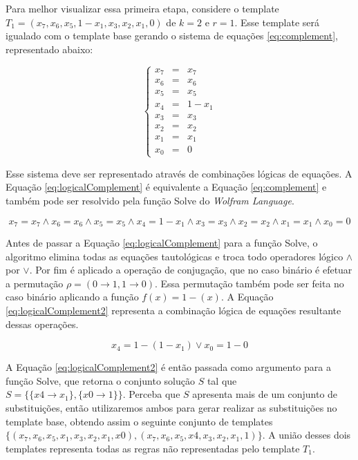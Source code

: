 \documentclass[12pt,a4paper]{article}
\begin{document}
	Para melhor visualizar essa primeira etapa, considere o template $T_1 = (x_7, x_6, x_5, 1 - x_1, x_3, x_2, x_1, 0)$ de $k=2$ e $r=1$. Esse template será igualado com o template base gerando o sistema de equações \ref{eq:complement}, representado abaixo:
	
	\begin{equation}
	\left\{\begin{matrix}
	x_7 & = & x_7	\\ 
	x_6 & = & x_6	\\ 
	x_5 & = & x_5	\\ 
	x_4 & = & 1 - x_1 \\ 
	x_3 & = & x_3	\\ 
	x_2 & = & x_2	\\ 
	x_1 & = & x_1	\\ 
	x_0 & = & 0
	\end{matrix}\right.
	\label{eq:complement}
	\end{equation}

	Esse sistema deve ser representado através de combinações lógicas de equações. A Equação \ref{eq:logicalComplement} é equivalente a Equação \ref{eq:complement} e também pode ser resolvido pela função Solve do \textit{Wolfram Language}.

	\begin{equation}
	x_7 = x_7	\wedge  
	x_6 = x_6	\wedge  
	x_5 = x_5	\wedge  
	x_4 = 1 - x_1 \wedge  
	x_3 = x_3	\wedge  
	x_2 = x_2	\wedge  
	x_1 = x_1	\wedge  
	x_0 = 0
	\label{eq:logicalComplement}
	\end{equation}

	Antes de passar a Equação \ref{eq:logicalComplement} para a função Solve, o algoritmo elimina todas as equações tautológicas e troca todo operadores lógico $\wedge$ por $\vee$. Por fim é aplicado a operação de conjugação, que no caso binário é efetuar a permutação $\rho = (0 \rightarrow 1, 1 \rightarrow 0)$. Essa permutação também pode ser feita no caso binário aplicando a função $f(x) = 1 - (x)$. A Equação \ref{eq:logicalComplement2} representa a combinação lógica de equações resultante dessas operações.

	\begin{equation}
	x_4 = 1 - (1 - x_1) \vee  
	x_0 = 1 - 0
	\label{eq:logicalComplement2}
	\end{equation}

	A Equação \ref{eq:logicalComplement2} é então passada como argumento para a função Solve, que retorna o conjunto solução $S$ tal que $S = \{\{x4 \to x_1\},\{x0\to 1\}\}$. Perceba que $S$ apresenta mais de um conjunto de substituições, então utilizaremos ambos para gerar realizar as substituições no template base, obtendo assim o seguinte conjunto de templates $\{(x_7,x_6,x_5,x_1,x_3,x_2,x_1,x0),(x_7,x_6,x_5,x4,x_3,x_2,x_1,1)\}$. A união desses dois templates representa todas as regras não representadas pelo template $T_1$.
\end{document}
